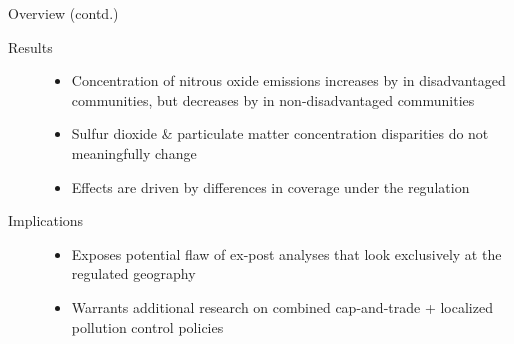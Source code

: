 \documentclass[11pt, aspectratio = 169]{beamer}
\newcommand{\1}{\mathds{1}}
\begin{document}
\begin{frame}{Overview (contd.)}
    
\begin{description}
    \item[Results]\begin{itemize}
        \item Concentration of nitrous oxide emissions increases by  in disadvantaged communities, but decreases by in non-disadvantaged communities
        \item Sulfur dioxide \& particulate matter concentration disparities do not meaningfully change
        \item Effects are driven by differences in coverage under the regulation  
    \end{itemize}
    \vfill
    \item[Implications]\begin{itemize}
        \item Exposes potential flaw of ex-post analyses that look exclusively at the regulated geography
        \item Warrants additional research on combined cap-and-trade + localized pollution control policies
    \end{itemize}
\end{description}

\end{frame}


    



\end{document}

